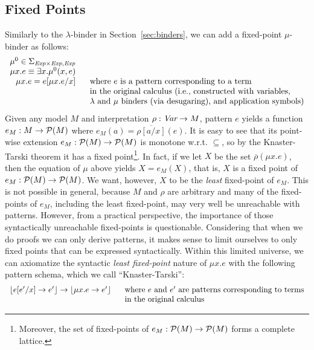 \documentclass[UTF8,11pt]{article}
\theoremstyle{plain}
\theoremstyle{definition}
\theoremstyle{remark}
\DeclarePairedDelimiter{\floor}{\lfloor}{\rfloor}
\newcommand{\Exp}{\textit{Exp}}
\newcommand{\ra}{\rightarrow}
\begin{document}
\subsection{Fixed Points}
\label{sec:fixed-points}

Similarly to the $\lambda$-binder in Section~\ref{sec:binders}, we can
add a fixed-point $\mu$-binder as follows:
$$
\begin{array}{r@{\hspace*{4ex}}l}
\mu^0 \in \Sigma_{\Exp\times\Exp,\Exp}
\\
\mu x . e \equiv \exists x . \mu^0(x,e)
\\
\mu x . e = e[\mu x.e/x]
& \textrm{where $e$ is a pattern corresponding to a term}
\\
& \textrm{in the original calculus (i.e., constructed with variables,}
\\
& \textrm{$\lambda$ and $\mu$ binders (via desugaring), and application 
symbols)}
\end{array}
$$
Given any model $M$ and interpretation $\rho : \Var \ra M$, pattern $e$
yields a function $e_M : M \rightarrow {\cal P}(M)$ where
$e_M(a) = \overline{\rho[a/x]}(e)$.
It is easy to see that its point-wise extension 
$e_M : {\cal P}(M) \rightarrow {\cal P}(M)$ is monotone w.r.t. $\subseteq$,
so by the Knaster-Tarski theorem it has a fixed point\footnote{
Moreover, the set of fixed-points of
$e_M : {\cal P}(M) \rightarrow {\cal P}(M)$ forms a complete lattice.}.
In fact, if we let $X$ be the set $\overline{\rho}(\mu x . e)$, then
the equation of $\mu$ above yields $X = e_M(X)$, that is, $X$ is a fixed point
of $e_M : {\cal P}(M) \rightarrow {\cal P}(M)$.
%
We want, however, $X$ to be the \emph{least} fixed-point of $e_M$.
This is not possible in general, because $M$ and $\rho$ are arbitrary
and many of the fixed-points of $e_M$, including the least fixed-point,
may very well be unreachable with patterns.
However, from a practical perspective, the importance of those syntactically
unreachable fixed-points is questionable.
Considering that when we do proofs we can only derive patterns, it makes
sense to limit ourselves to only fixed points that can be expressed
syntactically.
Within this limited universe, we can axiomatize the syntactic
\emph{least fixed-point} nature of $\mu x . e$ with the following
pattern schema, which we call ``Knaster-Tarski'':
$$
\begin{array}{r@{\hspace*{4ex}}l}
\floor{e[e'/x] \rightarrow e'} \rightarrow \floor{\mu x . e \rightarrow e'}
& \textrm{where $e$ and $e'$ are patterns corresponding to terms}
\\
& \textrm{in the original calculus}
\end{array}
$$
\end{document}
